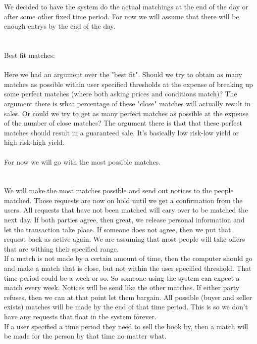 We decided to have the system do the actual matchings at the end of the day or
after some other fixed time period.  For now we will assume that there will be
enough entrys by the end of the day.\\
\\
\\
Best fit matches:\\
\\
Here we had an argument over the "best fit".  Should we try to obtain as many
matches as possible within user specified thresholds at the expense of breaking
up some perfect matches (where both asking prices and conditions match)?  The
argument there is what percentage of these "close" matches will actually result
in sales.  Or could we try to get as many perfect matches as possible at the expense of the
number of close matches?  The argument there is that that these perfect matches
should result in a guaranteed sale.
It's basically low risk-low yield or high risk-high yield.\\
\\
For now we will go with the most possible matches.\\
\\
\\
We will make the most matches possible and send out notices to the people
matched.  Those requests are now on hold until we get a confirmation from the
users.  All requests that have not been matched will cary over to be matched
the next day.  If both parties agree, then great, we release personal
information and let the transaction take place.  If someone does not agree,
then we put that request back as active again.  We are assuming that most
people will take offers that are withing their specified range.\\
If a match is not made by a certain amount of time, then the computer should go
and make a match that is close, but not within the user specified threshold.
That time period could be a week or so.  So someone using the system can expect
a match every week.  Notices will be send like the other matches.  If either
party refuses, then we can at that point let them bargain.  All possible (buyer
and seller exists) matches will be made by the end of that time period.  This
is so we don't have any requests that float in the system forever.\\
If a user specified a time period they need to sell the book by, then a match
will be made for the person by that time no matter what.\\
\\
\\


